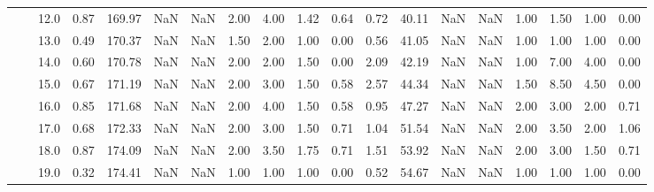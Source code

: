 \begin{tabular}{lllrrrrrrrrrrrrrrrr}
       &     & 12.0 &      0.87 &     169.97 &               NaN &                NaN &  2.00 &   4.00 &             1.42 &                         0.64 &      0.72 &      40.11 &               NaN &                NaN &  1.00 &   1.50 &             1.00 &                         0.00 \\
       &     & 13.0 &      0.49 &     170.37 &               NaN &                NaN &  1.50 &   2.00 &             1.00 &                         0.00 &      0.56 &      41.05 &               NaN &                NaN &  1.00 &   1.00 &             1.00 &                         0.00 \\
       &     & 14.0 &      0.60 &     170.78 &               NaN &                NaN &  2.00 &   2.00 &             1.50 &                         0.00 &      2.09 &      42.19 &               NaN &                NaN &  1.00 &   7.00 &             4.00 &                         0.00 \\
       &     & 15.0 &      0.67 &     171.19 &               NaN &                NaN &  2.00 &   3.00 &             1.50 &                         0.58 &      2.57 &      44.34 &               NaN &                NaN &  1.50 &   8.50 &             4.50 &                         0.00 \\
       &     & 16.0 &      0.85 &     171.68 &               NaN &                NaN &  2.00 &   4.00 &             1.50 &                         0.58 &      0.95 &      47.27 &               NaN &                NaN &  2.00 &   3.00 &             2.00 &                         0.71 \\
       &     & 17.0 &      0.68 &     172.33 &               NaN &                NaN &  2.00 &   3.00 &             1.50 &                         0.71 &      1.04 &      51.54 &               NaN &                NaN &  2.00 &   3.50 &             2.00 &                         1.06 \\
       &     & 18.0 &      0.87 &     174.09 &               NaN &                NaN &  2.00 &   3.50 &             1.75 &                         0.71 &      1.51 &      53.92 &               NaN &                NaN &  2.00 &   3.00 &             1.50 &                         0.71 \\
       &     & 19.0 &      0.32 &     174.41 &               NaN &                NaN &  1.00 &   1.00 &             1.00 &                         0.00 &      0.52 &      54.67 &               NaN &                NaN &  1.00 &   1.00 &             1.00 &                         0.00 \\

\end{tabular}
